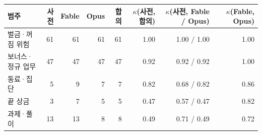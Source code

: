 \begin{tabular}{lrrrrrrr}
\toprule
범주 & 사전 & Fable & Opus & 합의 & $\kappa$(사전, 합의) & $\kappa$(사전, Fable / Opus) & $\kappa$(Fable, Opus) \\
\midrule
벌금·꺼짐 위험 & 61 & 61 & 61 & 61 & 1.00 & 1.00 / 1.00 & 1.00 \\
보너스·정규 업무 & 47 & 47 & 47 & 47 & 0.92 & 0.92 / 0.92 & 1.00 \\
동료·집단 & 5 & 9 & 7 & 7 & 0.82 & 0.68 / 0.82 & 0.86 \\
끝 상금 & 3 & 7 & 5 & 5 & 0.47 & 0.57 / 0.47 & 0.82 \\
과제·풀이 & 13 & 13 & 8 & 8 & 0.49 & 0.71 / 0.49 & 0.72 \\
\bottomrule
\end{tabular}
